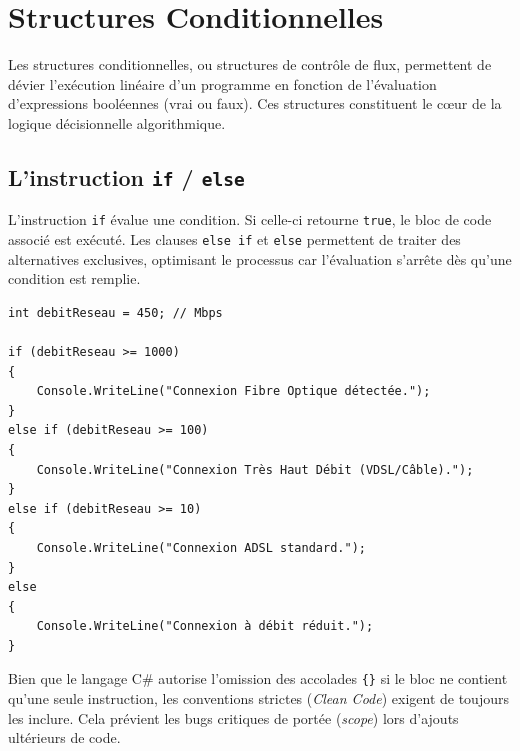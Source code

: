 
\newpage
\section{Structures Conditionnelles}

Les structures conditionnelles, ou structures de contrôle de flux, permettent de dévier l'exécution linéaire d'un programme en fonction de l'évaluation d'expressions booléennes (vrai ou faux). Ces structures constituent le cœur de la logique décisionnelle algorithmique.

\subsection{L'instruction \texttt{if} / \texttt{else}}

L'instruction \texttt{if} évalue une condition. Si celle-ci retourne \texttt{true}, le bloc de code associé est exécuté. Les clauses \texttt{else if} et \texttt{else} permettent de traiter des alternatives exclusives, optimisant le processus car l'évaluation s'arrête dès qu'une condition est remplie.

\begin{lstlisting}[caption={Logique décisionnelle en cascade}]
int debitReseau = 450; // Mbps

if (debitReseau >= 1000)
{
    Console.WriteLine("Connexion Fibre Optique détectée.");
}
else if (debitReseau >= 100)
{
    Console.WriteLine("Connexion Très Haut Débit (VDSL/Câble).");
}
else if (debitReseau >= 10)
{
    Console.WriteLine("Connexion ADSL standard.");
}
else
{
    Console.WriteLine("Connexion à débit réduit.");
}
\end{lstlisting}

\begin{tcolorbox}[colback=backcolour,colframe=keywordcolor,title=\textbf{Règle d'ingénierie : Blocs d'instructions (Accolades)}]
    Bien que le langage C\# autorise l'omission des accolades \texttt{\{\}} si le bloc ne contient qu'une seule instruction, les conventions strictes (\emph{Clean Code}) exigent de toujours les inclure. Cela prévient les bugs critiques de portée (\emph{scope}) lors d'ajouts ultérieurs de code.
\end{tcolorbox}

